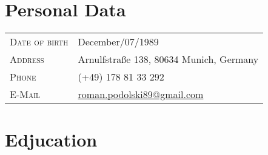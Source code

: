 \documentclass[a4paper,10pt]{article} %
\begin{document}
 
\pagestyle{empty} %
 
 
\par{\bigskip\par} %
 
\section{Personal Data}
 
\begin{tabular}{l@{: }l}
\textsc{Date of birth} & December/07/1989 \\
\textsc{Address}     & Arnulfstraße 138, 80634 Munich, Germany \\
\textsc{Phone}      & (+49) 178 81 33 292\\
\textsc{E-Mail}       & \href{mailto:roman.podolski89@gmail.com}{roman.podolski89@gmail.com}
\end{tabular}
 
 
\section{Edjucation}
 
\end{document}
